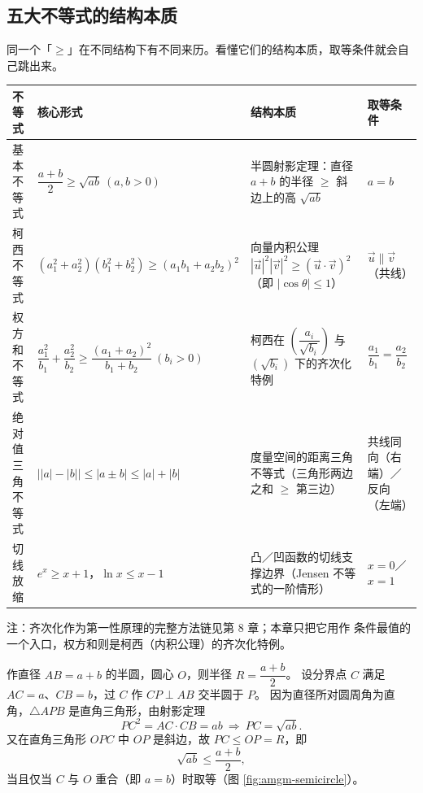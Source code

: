 \begin{explore}
\subsection{五大不等式的结构本质}


同一个「$\ge$」在不同结构下有不同来历。看懂它们的结构本质，取等条件就会自己跳出来。

\begin{center}\footnotesize\setlength{\tabcolsep}{4pt}\renewcommand{\arraystretch}{1.4}
\begin{tabular}{p{1.9cm}p{3.5cm}p{5.2cm}p{2.6cm}}
\toprule
不等式 & 核心形式 & 结构本质 & 取等条件 \\
\midrule
基本不等式 & $\dfrac{a+b}{2}\ge\sqrt{ab}\ (a,b>0)$ & 半圆射影定理：直径 $a+b$ 的半径 $\ge$ 斜边上的高 $\sqrt{ab}$ & $a=b$ \\[2pt]
柯西不等式 & $(a_1^2+a_2^2)(b_1^2+b_2^2)\ge(a_1b_1+a_2b_2)^2$ & 向量内积公理 $|\vec u|^2|\vec v|^2\ge(\vec u\cdot\vec v)^2$（即 $|\cos\theta|\le1$） & $\vec u\parallel\vec v$（共线） \\[2pt]
权方和不等式 & $\dfrac{a_1^2}{b_1}+\dfrac{a_2^2}{b_2}\ge\dfrac{(a_1+a_2)^2}{b_1+b_2}\ (b_i>0)$ & 柯西在 $\left(\dfrac{a_i}{\sqrt{b_i}}\right)$ 与 $(\sqrt{b_i})$ 下的齐次化特例 & $\dfrac{a_1}{b_1}=\dfrac{a_2}{b_2}$ \\[2pt]
绝对值三角不等式 & $\bigl||a|-|b|\bigr|\le|a\pm b|\le|a|+|b|$ & 度量空间的距离三角不等式（三角形两边之和 $\ge$ 第三边） & 共线同向（右端）／反向（左端） \\[2pt]
切线放缩 & $e^x\ge x+1$，$\ln x\le x-1$ & 凸／凹函数的切线支撑边界（Jensen 不等式的一阶情形） & $x=0$／$x=1$ \\
\bottomrule
\end{tabular}
\end{center}

注：齐次化作为第一性原理的完整方法链见第 8 章；本章只把它用作
条件最值的一个入口，权方和则是柯西（内积公理）的齐次化特例。

作直径 $AB=a+b$ 的半圆，圆心 $O$，则半径 $R=\dfrac{a+b}{2}$。
设分界点 $C$ 满足 $AC=a$、$CB=b$，过 $C$ 作 $CP\perp AB$ 交半圆于 $P$。
因为直径所对圆周角为直角，$\triangle APB$ 是直角三角形，由射影定理
\[
  PC^2=AC\cdot CB=ab\ \Rightarrow\ PC=\sqrt{ab}.
\]
又在直角三角形 $OPC$ 中 $OP$ 是斜边，故 $PC\le OP=R$，即
\[
  \sqrt{ab}\le\frac{a+b}{2},
\]
当且仅当 $C$ 与 $O$ 重合（即 $a=b$）时取等（图 \ref{fig:amgm-semicircle}）。


\end{explore}
